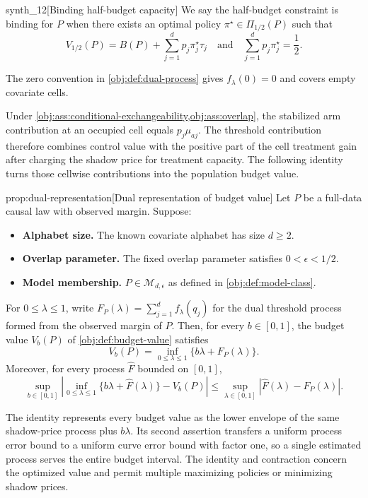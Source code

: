\begin{definitionv}{synth_12}[Binding half-budget capacity]
We say the half-budget constraint is binding for \(P\) when there exists an optimal policy \(\pi^\star\in\Pi_{1/2}(P)\) such that
\[
V_{1/2}(P)=B(P)+\sum_{j=1}^d p_j\pi^\star_j\tau_j
\quad\text{and}\quad
\sum_{j=1}^d p_j\pi^\star_j=\frac12.
\]
\end{definitionv}

The zero convention in \cref{obj:def:dual-process} gives \(f_\lambda(0)=0\) and covers empty covariate cells.

Under \cref{obj:ass:conditional-exchangeability,obj:ass:overlap}, the stabilized arm contribution at an occupied cell equals \(p_j\mu_{aj}\). The threshold contribution therefore combines control value with the positive part of the cell treatment gain after charging the shadow price for treatment capacity. The following identity turns those cellwise contributions into the population budget value.

\begin{propositionv}{prop:dual-representation}[Dual representation of budget value]
Let \(P\) be a full-data causal law with observed margin. Suppose:
\begin{itemize}
\item \textbf{Alphabet size.} The known covariate alphabet has size \(d\ge 2\).
\item \textbf{Overlap parameter.} The fixed overlap parameter satisfies \(0<\epsilon<1/2\).
\item \textbf{Model membership.} \(P\in\mathcal M_{d,\epsilon}\) as defined in \cref{obj:def:model-class}.
\end{itemize}
For \(0\le\lambda\le1\), write \(F_P(\lambda)=\sum_{j=1}^{d}f_\lambda(q_j)\) for the dual threshold process formed from the observed margin of \(P\). Then, for every \(b\in[0,1]\), the budget value \(V_b(P)\) of \cref{obj:def:budget-value} satisfies
\[
V_b(P)=\inf_{0\le\lambda\le1}\{b\lambda+F_P(\lambda)\}.
\]
Moreover, for every process \(\widehat F\) bounded on \([0,1]\),
\[
\sup_{b\in[0,1]}
\left|
\inf_{0\le\lambda\le1}\{b\lambda+\widehat F(\lambda)\}
-V_b(P)
\right|
\le
\sup_{\lambda\in[0,1]}
\left|\widehat F(\lambda)-F_P(\lambda)\right|.
\]
\end{propositionv}

The identity represents every budget value as the lower envelope of the same shadow-price process plus \(b\lambda\). Its second assertion transfers a uniform process error bound to a uniform curve error bound with factor one, so a single estimated process serves the entire budget interval. The identity and contraction concern the optimized value and permit multiple maximizing policies or minimizing shadow prices.

